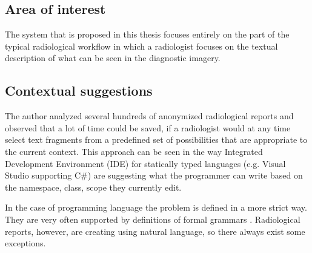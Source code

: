 \documentclass[12pt, twoside, openany]{report}
\theoremstyle{definition}
\begin{document}
\subsection{Area of interest}
The system that is proposed in this thesis focuses entirely on the part of the typical radiological workflow in which a radiologist focuses on the textual description of what can be seen in the diagnostic imagery.
\subsection{Contextual suggestions}
The author analyzed several hundreds of anonymized radiological reports and observed that a lot of time could be saved, if a radiologist would at any time select text fragments from a predefined set of possibilities that are appropriate to the current context. This approach can be seen in the way Integrated Development Environment (IDE) for statically typed languages (e.g. Visual Studio supporting C\#) are suggesting what the programmer can write based on the namespace, class, scope they currently edit.

In the case of programming language the problem is defined in a more strict way. They are very often supported by definitions of formal grammars \cite{csharp-spec}. Radiological reports, however, are creating using  natural language, so there always exist some exceptions.
\end{document}
